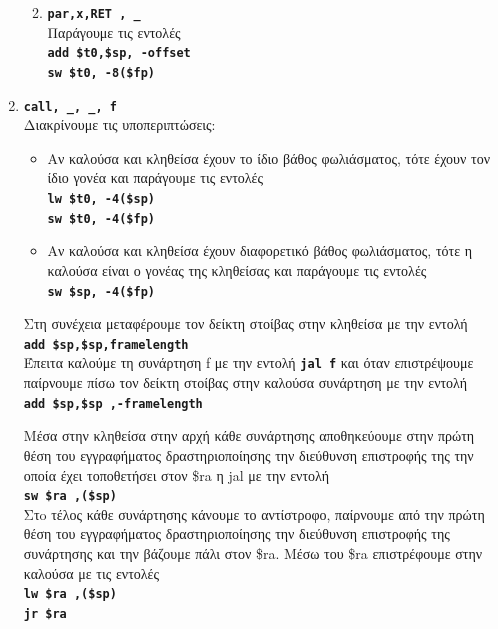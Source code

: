 \documentclass[a4paper]{article}
\let\OldTexttt\texttt
\renewcommand{\texttt}[1]{\OldTexttt{\textbf{#1}}}
\begin{document}
\begin{enumerate}
\begin{enumerate}
\begin{itemize}
            \end{itemize}
        \item \texttt{par,x,RET , \_} \\ Παράγουμε τις εντολές \\
            \texttt{add \$t0,\$sp, -offset \\ sw \$t0, -8(\$fp)}
    \end{enumerate}
    \item \texttt{call, \_, \_, f} \\ Διακρίνουμε τις υποπεριπτώσεις:
    \begin{itemize}
        \item Αν καλούσα και κληθείσα έχουν το ίδιο βάθος φωλιάσματος, τότε
            έχουν τον ίδιο γονέα και παράγουμε τις εντολές \\ \texttt{lw
            \$t0, -4(\$sp) \\ sw \$t0, -4(\$fp)}
        \item Αν καλούσα και κληθείσα έχουν διαφορετικό βάθος φωλιάσματος,
            τότε η καλούσα είναι ο γονέας της κληθείσας και παράγουμε τις
            εντολές \\ \texttt{sw \$sp, -4(\$fp)} 
    \end{itemize}

    Στη συνέχεια μεταφέρουμε τον δείκτη στοίβας στην κληθείσα με την εντολή
    \\ \texttt{add \$sp,\$sp,framelength} \\ Έπειτα καλούμε τη συνάρτηση f με
    την εντολή \texttt{jal f} και όταν επιστρέψουμε παίρνουμε πίσω τον
    δείκτη στοίβας στην καλούσα συνάρτηση με την εντολή \\ \texttt{add
    \$sp,\$sp ,-framelength}

    Μέσα στην κληθείσα στην αρχή κάθε συνάρτησης αποθηκεύουμε στην πρώτη
    θέση του εγγραφήματος δραστηριοποίησης την διεύθυνση επιστροφής της την
    οποία έχει τοποθετήσει στον \$ra η jal με την εντολή \\ \texttt{sw \$ra
    ,(\$sp)} \\ Στo τέλος κάθε συνάρτησης κάνουμε το αντίστροφο, παίρνουμε
    από την πρώτη θέση του εγγραφήματος δραστηριοποίησης την διεύθυνση
    επιστροφής της συνάρτησης και την βάζουμε πάλι στον \$ra. Μέσω του \$ra
    επιστρέφουμε στην καλούσα με τις εντολές \\ \texttt{lw \$ra ,(\$sp) \\ jr \$ra} 


\end{enumerate}
\end{document}
